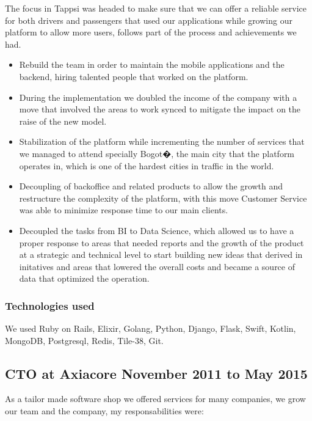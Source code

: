 \documentclass{article}
\begin{document}
The focus in Tappsi was headed to make sure that we can offer a reliable service for
both drivers and passengers that used our applications while growing our platform
to allow more users, follows part of the process and achievements we had.

\begin{itemize}
\item Rebuild the team in order to maintain the mobile applications and the backend, hiring talented people that worked on the platform.
\item During the implementation we doubled the income of the company with a move that involved the areas to work synced to mitigate the impact on the raise of the new model.
\item Stabilization of the platform while incrementing the number of services that we managed to attend specially Bogot�, the main city that the platform operates in, which is one of the hardest cities in traffic in the world.
\item Decoupling of backoffice and related products to allow the growth and restructure the complexity of the platform, with this move Customer Service was able to minimize response time to our main clients.
\item Decoupled the tasks from BI to Data Science, which allowed us to have a proper response to areas that needed reports and the growth of the product at a strategic and technical level to start building new ideas that derived in initatives and areas that lowered the overall costs and became a source of data that optimized the operation.
\end{itemize}

\subsubsection{Technologies used}
\label{sec:tappsitech}

We used Ruby on Rails, Elixir, Golang, Python, Django, Flask, Swift, Kotlin, MongoDB, Postgresql, Redis, Tile-38, Git.

\subsection{CTO at Axiacore November 2011 to May 2015}
\label{sec:axiacore}

As a tailor made software shop we offered services for many companies, we grow
our team and the company, my responsabilities were:
\end{document}
